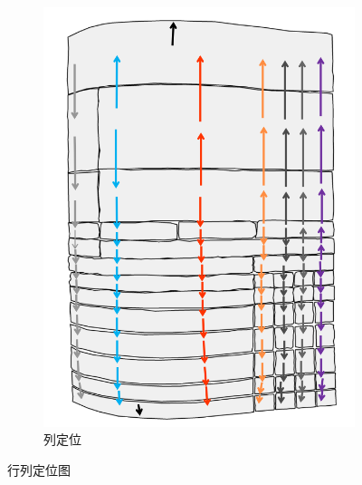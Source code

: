 \documentclass[UTF8,12pt, AutoFakeBold,fontset = founder]{ctexart}
\begin{document}
\begin{figure}[H]
\begin{subfigure}[b]{0.45\textwidth}
        \includegraphics[width=\textwidth]{../images/col.png}
        \caption{列定位}
        \label{fig:local-col}
    \end{subfigure}
    \caption{行列定位图}
    \label{fig:local}
\end{figure}
\end{document}
